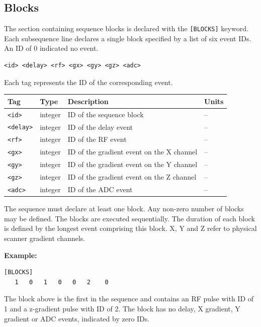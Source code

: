 \documentclass{article}
\begin{document}
\subsection{Blocks}

The section containing sequence blocks is declared with the \verb.[BLOCKS]. keyword. Each subsequence line declares a single block specified by a list of six event IDs. An ID of 0 indicated no event.
\begin{lstlisting}
<id> <delay> <rf> <gx> <gy> <gz> <adc>
\end{lstlisting}

Each tag represents the ID of the corresponding event.

\begin{tabularx}{\textwidth}{llXl}
\toprule
Tag & Type & Description & Units\\
\midrule
\verb.<id>. & integer & ID of the sequence block & -- \\
\verb.<delay>. & integer & ID of the delay event & -- \\
\verb.<rf>. & integer & ID of the RF event & -- \\
\verb.<gx>. & integer & ID of the gradient event on the X channel & --\\
\verb.<gy>. & integer & ID of the gradient event on the Y channel & -- \\
\verb.<gz>. & integer & ID of the gradient event on the Z channel & -- \\
\verb.<adc>. & integer & ID of the ADC event & -- \\
\bottomrule
\end{tabularx}

\begin{minipage}{\textwidth}
The sequence must declare at least one block. Any non-zero number of blocks may be defined. The blocks are executed sequentially. The duration of each block is defined by the longest event comprising this block. X, Y and Z refer to physical scanner gradient channels.


\textbf{Example:}
\begin{lstlisting}
[BLOCKS]
   1   0   1   0   0   2    0
\end{lstlisting}
\end{minipage}

The block above is the first in the sequence and contains an RF pulse with ID of 1 and a z-gradient pulse with ID of 2. The block has no delay, X gradient, Y gradient or ADC events, indicated by zero IDs.
\end{document}
